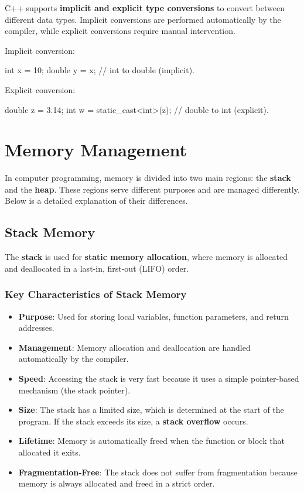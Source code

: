C++ supports \textbf{implicit and explicit type conversions} to convert between different data types. Implicit conversions are performed automatically by the compiler, while explicit conversions require manual intervention.

\begin{exampleblock}
    Implicit conversion:
    \begin{codeblock}[language=C++]
int x = 10;
double y = x; // int to double (implicit).
    \end{codeblock}
    Explicit conversion:
    \begin{codeblock}[language=C++]
double z = 3.14;
int w = static_cast<int>(z); // double to int (explicit).
    \end{codeblock}
\end{exampleblock}

\section{Memory Management}

In computer programming, memory is divided into two main regions: the \textbf{stack} and the \textbf{heap}. These regions serve different purposes and are managed differently. Below is a detailed explanation of their differences.

\subsection{Stack Memory}

The \textbf{stack} is used for \textbf{static memory allocation}, where memory is allocated and deallocated in a last-in, first-out (LIFO) order.

\subsubsection{Key Characteristics of Stack Memory}
\begin{itemize}
    \item \textbf{Purpose}: Used for storing local variables, function parameters, and return addresses.
    \item \textbf{Management}: Memory allocation and deallocation are handled automatically by the compiler.
    \item \textbf{Speed}: Accessing the stack is very fast because it uses a simple pointer-based mechanism (the stack pointer).
    \item \textbf{Size}: The stack has a limited size, which is determined at the start of the program. If the stack exceeds its size, a \textbf{stack overflow} occurs.
    \item \textbf{Lifetime}: Memory is automatically freed when the function or block that allocated it exits.
    \item \textbf{Fragmentation-Free}: The stack does not suffer from fragmentation because memory is always allocated and freed in a strict order.
\end{itemize}


